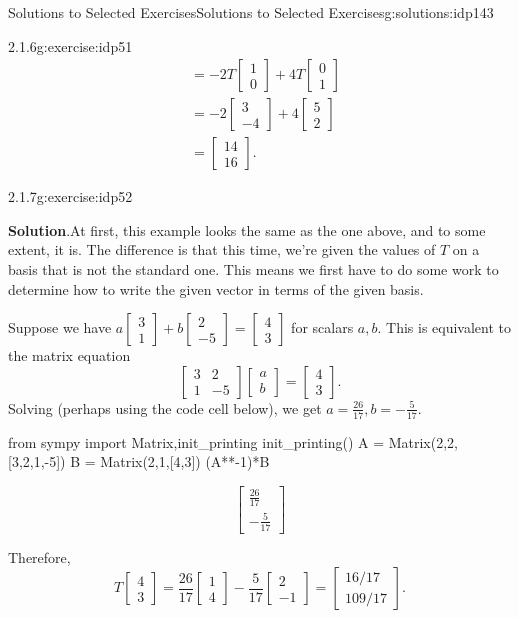 \documentclass[oneside,10pt,]{book}
\newcommand{\blocktitlefont}{\relax}
\numberwithin{equation}{section}
\newcommand{\bbm}{\begin{bmatrix}}
\newcommand{\ebm}{\end{bmatrix}}
\newcommand{\amp}{&}
\begin{document}
\begin{solutions-chapter}{Solutions to Selected Exercises}{}{Solutions to Selected Exercises}{}{}{g:solutions:idp143}
\begin{inlinesolution}{2.1.6}{}{g:exercise:idp51}
\begin{align*}
\amp = -2T\bbm1\\0\ebm+4T\bbm 0\\1\ebm\\
\amp = -2\bbm 3\\-4\ebm +4\bbm 5\\2\ebm\\
\amp = \bbm 14\\16\ebm\text{.}
\end{align*}
%
\end{inlinesolution}%
\begin{inlinesolution}{2.1.7}{}{g:exercise:idp52}%
\par\smallskip%
\noindent\textbf{\blocktitlefont Solution}.\hypertarget{g:solution:idp157-back}{}\quad{}At first, this example looks the same as the one above, and to some extent, it is. The difference is that this time, we're given the values of \(T\) on a basis that is not the standard one. This means we first have to do some work to determine how to write the given vector in terms of the given basis.%
\par
Suppose we have \(a\bbm 3\\1\ebm+b\bbm 2\\-5\ebm = \bbm 4\\3\ebm\) for scalars \(a,b\). This is equivalent to the matrix equation%
\begin{equation*}
\bbm 3\amp 2\\1\amp -5\ebm\bbm a\\b\ebm = \bbm 4\\3\ebm.
\end{equation*}
Solving (perhaps using the code cell below), we get \(a=\frac{26}{17}, b = -\frac{5}{17}\).%
\begin{sageinput}
from sympy import Matrix,init_printing
init_printing()
A = Matrix(2,2,[3,2,1,-5])
B = Matrix(2,1,[4,3])
(A**-1)*B
\end{sageinput}
\begin{sageoutput}
\[\bbm \frac{26}{17}\\-\frac{5}{17}\ebm\]
\end{sageoutput}
Therefore,%
\begin{equation*}
T\bbm 4\\3\ebm = \frac{26}{17}\bbm 1\\4\ebm -\frac{5}{17}\bbm 2\\-1\ebm = \bbm 16/17\\109/17\ebm\text{.}
\end{equation*}
%
\end{inlinesolution}%

\end{solutions-chapter}
\end{document}
